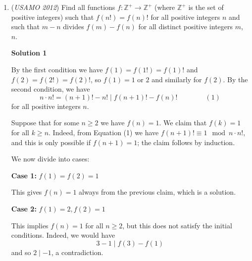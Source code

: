\begin{enumerate}
 
 \[Pa_P - Qa_Q = C_2\]

 Case (iii): $3Q\le n$. In this case, let $a_2=3$, $a_3=-2$, and $a_x = 1$ for all prime numbers $3<x<Q$, and $a_{xy}=a_xa_y$, then (*) becomes:

 
 \[Pa_P + Qa_Q + 3Qa_{2Q} - 2Qa_{3Q} = C_3\]

 or
 \[Pa_P + Qa_Q = C_3\]

 In each case, by Bezout's Theorem, there exists non zero integers $a_P$ and $a_Q$ which satisfy the equation. For all other primes $p > P$, just let $a_p=1$ (or any other non-zero integer).

 This construction is correct because, for any $k> 1$, 

 
 \[a_k + 2 a_{2k} + \cdots n a_{nk} =  a_k (1 + 2 a_2 + \cdots n a_n ) = 0\] 

 Since Bertrand's Theorem is not elementary, we still need to wait for a better proof.

 --\href{https://artofproblemsolving.com/wiki/index.php?title=User:Lightest}{Lightest} 21:24, 2 May 2012 (EDT)

 


	\item (\textit{USAMO 2012}) Find all functions $f : \mathbb{Z}^+ \to \mathbb{Z}^+$ (where $\mathbb{Z}^+$ is the set of positive integers) such that $f(n!) = f(n)!$ for all positive integers $n$ and such that $m - n$ divides $f(m) - f(n)$ for all distinct positive integers $m$, $n$.


 



\textbf{Solution 1}

By the first condition we have $f(1)=f(1!)=f(1)!$ and $f(2)=f(2!)=f(2)!$, so $f(1)=1$ or $2$ and similarly for $f(2)$.  By the second condition, we have
 \[n\cdot n!=(n+1)!-n! \mid f(n+1)!-f(n)! \qquad \qquad (1)\]for all positive integers $n$.

 Suppose that for some $n \geq 2$ we have $f(n) = 1$.  We claim that $f(k)=1$ for all $k\ge n$. Indeed, from Equation (1) we have $f(n+1)!\equiv 1 \mod n\cdot n!$, and this is only possible if $f(n+1)=1$; the claim follows by induction.

 We now divide into cases:

 \textbf{Case 1:} $f(1)=f(2)=1$ 

 This gives $f(n)=1$ always from the previous claim, which is a solution. 

 \textbf{Case 2:} $f(1)=2, f(2)=1$ 

 This implies $f(n)=1$ for all $n\ge 2$, but this does not satisfy the initial conditions. Indeed, we would have
 \[3-1 \mid f(3)-f(1)\]and so $2\mid -1$, a contradiction.


\end{enumerate}
